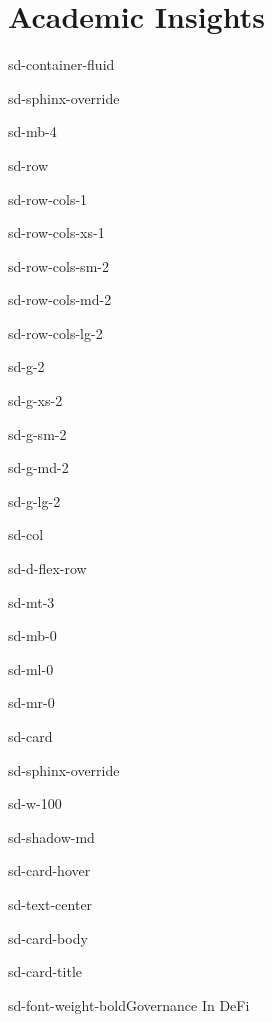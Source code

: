 \documentclass[letterpaper,10pt,english]{jupyterBook}
\begin{document}
\sphinxstepscope


\chapter{Academic Insights}
\label{\detokenize{STRUCTURE/academic:academic-insights}}\label{\detokenize{STRUCTURE/academic:nb-gallery}}\label{\detokenize{STRUCTURE/academic::doc}}
\begin{sphinxuseclass}{sd-container-fluid}
\begin{sphinxuseclass}{sd-sphinx-override}
\begin{sphinxuseclass}{sd-mb-4}
\begin{sphinxuseclass}{sd-row}
\begin{sphinxuseclass}{sd-row-cols-1}
\begin{sphinxuseclass}{sd-row-cols-xs-1}
\begin{sphinxuseclass}{sd-row-cols-sm-2}
\begin{sphinxuseclass}{sd-row-cols-md-2}
\begin{sphinxuseclass}{sd-row-cols-lg-2}
\begin{sphinxuseclass}{sd-g-2}
\begin{sphinxuseclass}{sd-g-xs-2}
\begin{sphinxuseclass}{sd-g-sm-2}
\begin{sphinxuseclass}{sd-g-md-2}
\begin{sphinxuseclass}{sd-g-lg-2}
\begin{sphinxuseclass}{sd-col}
\begin{sphinxuseclass}{sd-d-flex-row}
\begin{sphinxuseclass}{sd-mt-3}
\begin{sphinxuseclass}{sd-mb-0}
\begin{sphinxuseclass}{sd-ml-0}
\begin{sphinxuseclass}{sd-mr-0}
\begin{sphinxuseclass}{sd-card}
\begin{sphinxuseclass}{sd-sphinx-override}
\begin{sphinxuseclass}{sd-w-100}
\begin{sphinxuseclass}{sd-shadow-md}
\begin{sphinxuseclass}{sd-card-hover}
\begin{sphinxuseclass}{sd-text-center}
\begin{sphinxuseclass}{sd-card-body}
\begin{sphinxuseclass}{sd-card-title}
\begin{sphinxuseclass}{sd-font-weight-bold}Governance In DeFi

\end{sphinxuseclass}
\end{sphinxuseclass}
\end{sphinxuseclass}
\end{sphinxuseclass}
\end{sphinxuseclass}
\end{sphinxuseclass}
\end{sphinxuseclass}
\end{sphinxuseclass}
\end{sphinxuseclass}
\end{sphinxuseclass}
\end{sphinxuseclass}
\end{sphinxuseclass}
\end{sphinxuseclass}
\end{sphinxuseclass}
\end{sphinxuseclass}
\end{sphinxuseclass}
\end{sphinxuseclass}
\end{sphinxuseclass}
\end{sphinxuseclass}
\end{sphinxuseclass}
\end{sphinxuseclass}
\end{sphinxuseclass}
\end{sphinxuseclass}
\end{sphinxuseclass}
\end{sphinxuseclass}
\end{sphinxuseclass}
\end{sphinxuseclass}
\end{sphinxuseclass}
\end{sphinxuseclass}
\end{document}
